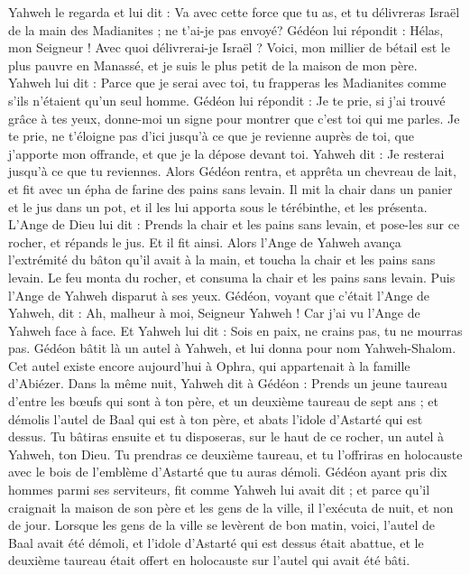 \begin{multicols}{2}
Yahweh le regarda et lui dit : Va avec cette force que tu as, et tu délivreras Israël de la main des Madianites ; ne t'ai-je pas envoyé?
Gédéon lui répondit : Hélas, mon Seigneur ! Avec quoi délivrerai-je Israël ? Voici, mon millier de bétail est le plus pauvre en Manassé, et je suis le plus petit de la maison de mon père.
Yahweh lui dit : Parce que je serai avec toi, tu frapperas les Madianites comme s'ils n'étaient qu'un seul homme.
Gédéon lui répondit : Je te prie, si j'ai trouvé grâce à tes yeux, donne-moi un signe pour montrer que c'est toi qui me parles.
Je te prie, ne t’éloigne pas d’ici jusqu'à ce que je revienne auprès de toi, que j'apporte mon offrande, et que je la dépose devant toi. Yahweh dit : Je resterai jusqu'à ce que tu reviennes.
Alors Gédéon rentra, et apprêta un chevreau de lait, et fit avec un épha de farine des pains sans levain. Il mit la chair dans un panier et le jus dans un pot, et il les lui apporta sous le térébinthe, et les présenta.
L'Ange de Dieu lui dit : Prends la chair et les pains sans levain, et pose-les sur ce rocher, et répands le jus. Et il fit ainsi.
Alors l'Ange de Yahweh avança l’extrémité du bâton qu'il avait à la main, et toucha la chair et les pains sans levain. Le feu monta du rocher, et consuma la chair et les pains sans levain. Puis l'Ange de Yahweh disparut à ses yeux.
Gédéon, voyant que c'était l'Ange de Yahweh, dit : Ah, malheur à moi, Seigneur Yahweh ! Car j'ai vu l’Ange de Yahweh face à face.
Et Yahweh lui dit : Sois en paix, ne crains pas, tu ne mourras pas.
Gédéon bâtit là un autel à Yahweh, et lui donna pour nom Yahweh-Shalom. Cet autel existe encore aujourd'hui à Ophra, qui appartenait à la famille d'Abiézer.
Dans la même nuit, Yahweh dit à Gédéon : Prends un jeune taureau d'entre les bœufs qui sont à ton père, et un deuxième taureau de sept ans ; et démolis l'autel de Baal qui est à ton père, et abats l’idole d'Astarté qui est dessus.
Tu bâtiras ensuite et tu disposeras, sur le haut de ce rocher, un autel à Yahweh, ton Dieu. Tu prendras ce deuxième taureau, et tu l'offriras en holocauste avec le bois de l’emblème d’Astarté que tu auras démoli.
Gédéon ayant pris dix hommes parmi ses serviteurs, fit comme Yahweh lui avait dit ; et parce qu'il craignait la maison de son père et les gens de la ville, il l’exécuta de nuit, et non de jour.
Lorsque les gens de la ville se levèrent de bon matin, voici, l'autel de Baal avait été démoli, et l'idole d'Astarté qui est dessus était abattue, et le deuxième taureau était offert en holocauste sur l'autel qui avait été bâti.

\end{multicols}
